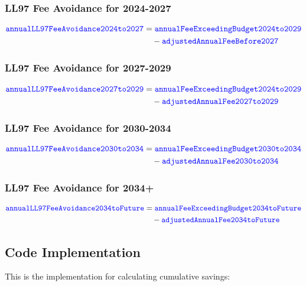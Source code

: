 \documentclass{article}
\newcommand{\code}[1]{\textcolor{blue}{\texttt{#1}}}
\begin{document}
\subsubsection{LL97 Fee Avoidance for 2024-2027}

\begin{align}
\code{annualLL97FeeAvoidance2024to2027} &= \code{annualFeeExceedingBudget2024to2029} \nonumber\\
&\quad - \code{adjustedAnnualFeeBefore2027}
\end{align}

\subsubsection{LL97 Fee Avoidance for 2027-2029}

\begin{align}
\code{annualLL97FeeAvoidance2027to2029} &= \code{annualFeeExceedingBudget2024to2029} \nonumber \\
&\quad - \code{adjustedAnnualFee2027to2029}
\end{align}

\subsubsection{LL97 Fee Avoidance for 2030-2034}

\begin{align}
\code{annualLL97FeeAvoidance2030to2034} &= \code{annualFeeExceedingBudget2030to2034} \nonumber \\
&\quad - \code{adjustedAnnualFee2030to2034}
\end{align}

\subsubsection{LL97 Fee Avoidance for 2034+}

\begin{align}
\code{annualLL97FeeAvoidance2034toFuture} &= \code{annualFeeExceedingBudget2034toFuture} \nonumber \\
&\quad - \code{adjustedAnnualFee2034toFuture}
\end{align}

\newpage
\subsection{Code Implementation}

This is the implementation for calculating cumulative savings:
\end{document}
